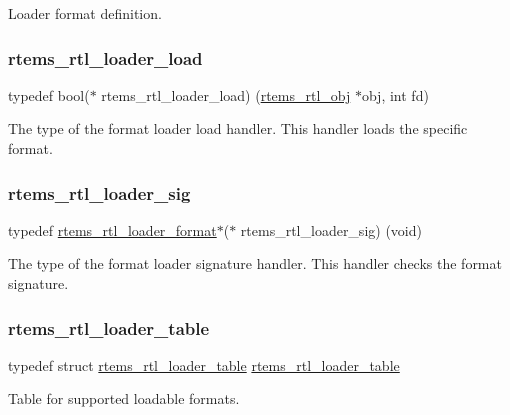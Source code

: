 Loader format definition. \mbox{\label{rtl-obj_8h_a6d119678fa2e324376060e8b09ea56cf}} 
\subsubsection{\texorpdfstring{rtems\_rtl\_loader\_load}{rtems\_rtl\_loader\_load}}
{\footnotesize\ttfamily typedef bool($\ast$ rtems\+\_\+rtl\+\_\+loader\+\_\+load) (\mbox{\hyperlink{structrtems__rtl__obj}{rtems\+\_\+rtl\+\_\+obj}} $\ast$obj, int fd)}

The type of the format loader load handler. This handler loads the specific format. \mbox{\label{rtl-obj_8h_a31673e6af5ca5b1e8ccb074cfac376ba}} 
\subsubsection{\texorpdfstring{rtems\_rtl\_loader\_sig}{rtems\_rtl\_loader\_sig}}
{\footnotesize\ttfamily typedef \mbox{\hyperlink{structrtems__rtl__loader__format}{rtems\+\_\+rtl\+\_\+loader\+\_\+format}}$\ast$($\ast$ rtems\+\_\+rtl\+\_\+loader\+\_\+sig) (void)}

The type of the format loader signature handler. This handler checks the format signature. \mbox{\label{rtl-obj_8h_ab0b37adc773babd5318fdc28636b2eb2}} 
\subsubsection{\texorpdfstring{rtems\_rtl\_loader\_table}{rtems\_rtl\_loader\_table}}
{\footnotesize\ttfamily typedef struct \mbox{\hyperlink{structrtems__rtl__loader__table}{rtems\+\_\+rtl\+\_\+loader\+\_\+table}}  \mbox{\hyperlink{structrtems__rtl__loader__table}{rtems\+\_\+rtl\+\_\+loader\+\_\+table}}}

Table for supported loadable formats. \mbox{\label{rtl-obj_8h_afacdc84b4af0a65a15b4ef38ebef6ab0}} 
